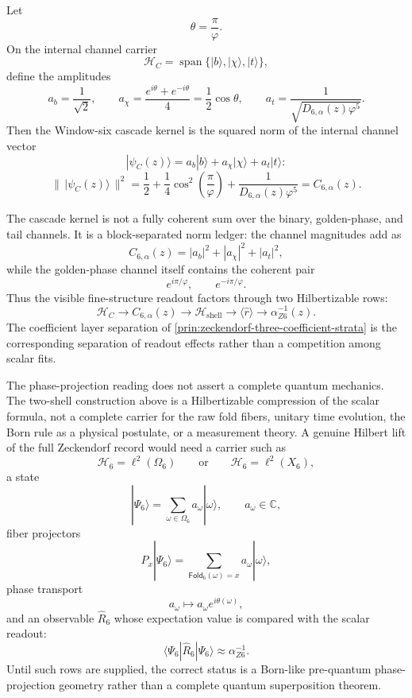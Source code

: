 \begin{definition}
\label{def:zeckendorf-cascade-kernel-internal-channel-norm}
Let
$$
  \theta=\frac{\pi}{\varphi}.
$$
On the internal channel carrier
$$
  \mathcal{H}_C
  =
  \operatorname{span}\{|b\rangle,|\chi\rangle,|t\rangle\},
$$
define the amplitudes
$$
  a_b=\frac{1}{\sqrt2},
  \qquad
  a_\chi=\frac{e^{i\theta}+e^{-i\theta}}{4}
  =
  \frac12\cos\theta,
  \qquad
  a_t=\frac{1}{\sqrt{D_{6,\alpha}(z)\varphi^5}}.
$$
Then the Window-six cascade kernel is the squared norm of the internal
channel vector
$$
  |\psi_C(z)\rangle
  =
  a_b|b\rangle+a_\chi|\chi\rangle+a_t|t\rangle:
$$
$$
  \|\,|\psi_C(z)\rangle\,\|^2
  =
  \frac12
  +
  \frac14\cos^2\left(\frac{\pi}{\varphi}\right)
  +
  \frac{1}{D_{6,\alpha}(z)\varphi^5}
  =
  C_{6,\alpha}(z).
$$
\end{definition}

\begin{principle}
\label{prin:zeckendorf-block-separated-internal-coherence}
The cascade kernel is not a fully coherent sum over the binary,
golden-phase, and tail channels. It is a block-separated norm ledger:
the channel magnitudes add as
$$
  C_{6,\alpha}(z)=|a_b|^2+|a_\chi|^2+|a_t|^2,
$$
while the golden-phase channel itself contains the coherent pair
$$
  e^{i\pi/\varphi},\qquad e^{-i\pi/\varphi}.
$$
Thus the visible fine-structure readout factors through two
Hilbertizable rows:
$$
  \mathcal{H}_C
  \longrightarrow
  C_{6,\alpha}(z)
  \longrightarrow
  \mathcal{H}_{\mathrm{shell}}
  \longrightarrow
  \langle\widehat r\rangle
  \longrightarrow
  \alpha_{Z6}^{-1}(z).
$$
The coefficient layer separation of
\autoref{prin:zeckendorf-three-coefficient-strata} is the corresponding
separation of readout effects rather than a competition among scalar
fits.
\end{principle}

\begin{principle}
\label{prin:zeckendorf-hilbert-boundary-phase-record}
The phase-projection reading does not assert a complete quantum
mechanics. The two-shell construction above is a Hilbertizable
compression of the scalar formula, not a complete carrier for the raw
fold fibers, unitary time evolution, the Born rule as a physical
postulate, or a measurement theory. A genuine Hilbert lift of the full
Zeckendorf record would need a carrier such as
$$
  \mathcal{H}_6=\ell^2(\Omega_6)
  \qquad\text{or}\qquad
  \mathcal{H}_6=\ell^2(X_6),
$$
a state
$$
  |\Psi_6\rangle
  =
  \sum_{\omega\in\Omega_6}a_\omega|\omega\rangle,
  \qquad
  a_\omega\in\mathbb{C},
$$
fiber projectors
$$
  P_x|\Psi_6\rangle
  =
  \sum_{\mathsf{Fold}_6(\omega)=x}a_\omega|\omega\rangle,
$$
phase transport
$$
  a_\omega\longmapsto a_\omega e^{i\theta(\omega)},
$$
and an observable $\widehat{R}_6$ whose expectation value is compared
with the scalar readout:
$$
  \langle\Psi_6|\widehat{R}_6|\Psi_6\rangle
  \approx
  \alpha_{Z6}^{-1}.
$$
Until such rows are supplied, the correct status is a Born-like
pre-quantum phase-projection geometry rather than a complete quantum
superposition theorem.
\end{principle}

